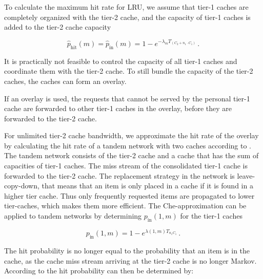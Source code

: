 To calculate the maximum hit rate for LRU, we assume that tier-1 caches are completely organized with the tier-2 cache, and the capacity of tier-1 caches is added to the tier-2 cache capacity

\begin{equation}
\hat p_\text{hit}(m)=\hat p_\text{in}(m)=1-e^{-\lambda_{m}T_{(C_2+n_1\cdot C_{1})}} \, .
\end{equation}

It is practically not feasible to control the capacity of all tier-1 caches and coordinate them with the tier-2 cache.
To still bundle the capacity of the tier-2 caches, the caches can form an overlay.




If an overlay is used, the requests that cannot be served by the personal tier-1 cache are forwarded to other tier-1 caches in the overlay, before they are forwarded to the tier-2 cache.


For unlimited tier-2 cache bandwidth, we approximate the hit rate of the overlay by calculating the hit rate of a tandem network with two caches according to \cite{martina2014unified}. The tandem network consists of the tier-2 cache and a cache that has the sum of capacities of tier-1 caches. The miss stream of the consolidated tier-1 cache is forwarded to the tier-2 cache.
The replacement strategy in the network is leave-copy-down, that means that an item is only placed in a cache if it is found in a higher tier cache. Thus only frequently requested items are propagated to lower tier-caches, which makes them more efficient. The Che-approximation can be applied to tandem networks by determining $p_\text{in}(1,m)$ for the tier-1 caches

\begin{equation}
p_\text{in}(1,m) = 1-e^{\lambda(1,m)T_{n_1 C_1}} \, .
\end{equation}

The hit probability is no longer equal to the probability that an item is in the cache, as the cache miss stream arriving at the tier-2 cache is no longer Markov. According to \cite{martina2014unified} the hit probability can then be determined by:

